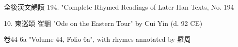 
全後漢文韻讀 194. 
"Complete Rhymed Readings of Later Han Texts, No. 194

10. 東巡頌 崔駰
"Ode on the Eastern Tour" by Cui Yin (d. 92 CE)

卷44-6a
"Volume 44, Folio 6a", with rhymes annotated by 
羅周



 
\begin{longtable}{p{} p{}}















\end{longtable}
